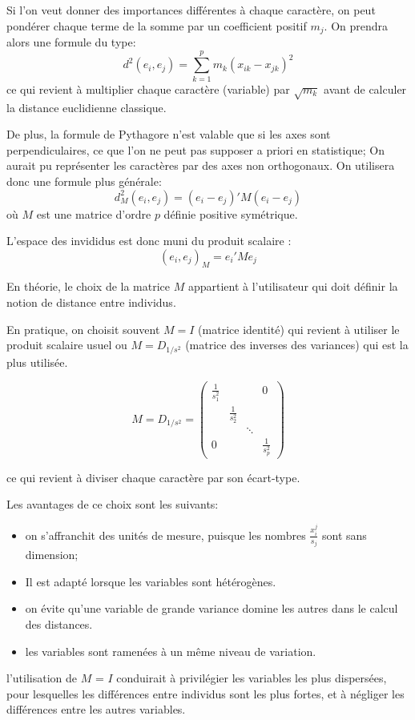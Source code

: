\documentclass[12pt,a4paper]{article}
\begin{document}
Si l'on veut donner des importances différentes à chaque caractère, on peut pondérer chaque terme de la somme par un coefficient positif $m_j$.
On prendra alors une formule du type:
\[d^2(e_i, e_j) = \sum_{k=1}^p m_k (x_{ik} - x_{jk})^2\]
ce qui revient à multiplier chaque caractère (variable) par $\sqrt{m_k}$ avant de calculer la distance euclidienne classique.

De plus, la formule de Pythagore n'est valable que si les axes sont perpendiculaires, ce que l'on ne peut pas supposer a priori en statistique; On aurait pu représenter les caractères par des axes non orthogonaux.
On utilisera donc une formule plus générale:
\[d_M^2(e_i, e_j) = (e_i - e_j)' M (e_i - e_j)\]
où $M$ est une matrice d'ordre $p$ définie positive symétrique.

L'espace des invididus est donc muni du produit scalaire : 
\[(e_i, e_j)_M = e_i' M e_j\]

En théorie, le choix de la matrice $M$ appartient à l'utilisateur qui doit définir la notion de distance entre individus. 

En pratique, on choisit souvent $M = I$ (matrice identité) qui revient à utiliser le produit scalaire usuel ou $M = D_{1/s^2}$ (matrice des inverses des variances) qui est la plus utilisée.

\[
M = D_{1/s^2} =
\begin{pmatrix}
\frac{1}{s_1^2} &  &  & 0 \\
 & \frac{1}{s_2^2} &  &  \\
  &  & \ddots &  \\
0 &  &   & \frac{1}{s_p^2}
\end{pmatrix}
\]

ce qui revient à diviser chaque caractère par son écart-type. 

Les avantages de ce choix sont les suivants:
\begin{itemize}
\item on s'affranchit des unités de mesure, puisque les nombres $\frac{x_{i}^j}{s_j}$ sont sans dimension;
\item Il est adapté lorsque les variables sont hétérogènes.
\item on évite qu'une variable de grande variance domine les autres dans le calcul des distances.
\item les variables sont ramenées à un même niveau de variation.
\end{itemize}

l'utilisation de $M$ = $I$ conduirait à privilégier les variables les plus dispersées, pour lesquelles les différences entre individus sont les plus fortes, et à négliger les différences entre les autres variables.
\end{document}
